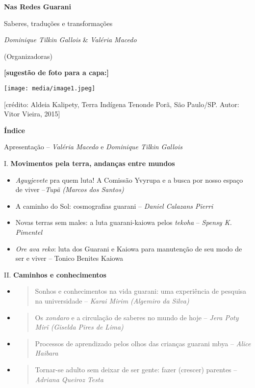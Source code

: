 \textbf{Nas Redes Guarani}

Saberes, traduções e transformações

\emph{Dominique Tilkin Gallois} \& \emph{Valéria Macedo}

(Organizadoras)

\textbf{{[}sugestão de foto para a capa:{]}}

\texttt{[image: media/image1.jpeg]}

{[}crédito: Aldeia Kalipety, Terra Indígena Tenonde Porã, São Paulo/SP.
Autor: Vitor Vieira, 2015{]}

\textbf{Índice}

Apresentação -- \emph{Valéria Macedo} e \emph{Dominique Tilkin Gallois}

I. \textbf{Movimentos pela terra, andanças entre mundos}

\begin{itemize}
\item
  \emph{Aguyjevete} pra quem luta! A Comissão Yvyrupa e a busca por
  nosso espaço de viver --\emph{Tupã (Marcos dos Santos)}
\item
  A caminho do Sol: cosmografias guarani -- \emph{Daniel Calazans
  Pierri}
\item
  Novas terras sem males: a luta guarani-kaiowa pelos \emph{tekoha} --
  \emph{Spensy K. Pimentel}
\item
  \emph{Ore ava reko}: luta dos Guarani e Kaiowa para manutenção de seu
  modo de ser e viver -- Tonico Benites Kaiowa
\end{itemize}

II. \textbf{Caminhos e conhecimentos}

\begin{itemize}
\item
  \begin{quote}
  Sonhos e conhecimentos na vida guarani: uma experiência de pesquisa na
  universidade -- \emph{Karai Mirim (Algemiro da Silva)}
  \end{quote}
\item
  \begin{quote}
  Os \emph{xondaro} e a circulação de saberes no mundo de hoje --
  \emph{Jera Poty Mirĩ (Giselda Pires de Lima)}
  \end{quote}
\item
  \begin{quote}
  Processos de aprendizado pelos olhos das crianças guarani mbya --
  \emph{Alice Haibara}
  \end{quote}
\item
  \begin{quote}
  Tornar-se adulto sem deixar de ser gente: fazer (crescer) parentes --
  \emph{Adriana Queiroz Testa}
  \end{quote}
\end{itemize}

